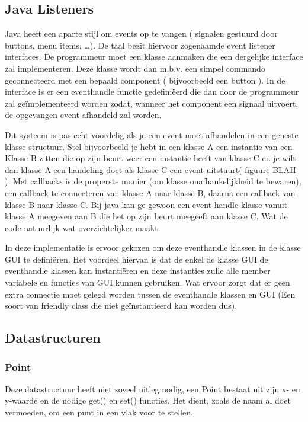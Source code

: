 \documentclass[a4paper,11pt,oneside, titlepage]{article}
\begin{document}
\subsection{Java Listeners}
Java heeft een aparte stijl om events op te vangen ( signalen gestuurd door buttons, menu items,
\ldots ). De taal bezit hiervoor zogenaamde event listener interfaces. De programmeur
moet een klasse aanmaken die een dergelijke interface zal implementeren. Deze klasse wordt dan
m.b.v. een simpel commando geconnecteerd met een bepaald component ( bijvoorbeeld een button ).
In de interface is er een eventhandle functie gedefini\"eerd die dan door de programmeur zal 
ge\"implementeerd worden zodat, wanneer het component een signaal uitvoert,
de opgevangen event afhandeld zal worden.\newline

Dit systeem is pas echt voordelig als je een event moet afhandelen in een geneste klasse 
structuur. Stel bijvoorbeeld je hebt in een klasse A een instantie van een Klasse B zitten
die op zijn beurt weer een instantie heeft van klasse C en je wilt dan klasse A een handeling
doet als klasse C een event uitstuurt( figuure BLAH ). 
Met callbacks is de properste manier (om klasse onafhankelijkheid te bewaren), een callback 
te connecteren van klasse A naar klasse B, daarna een callback van klasse B naar klasse C. 
Bij java kan ge gewoon een event handle klasse vanuit klasse A meegeven aan B die het op zijn 
beurt meegeeft aan klasse C. Wat de code natuurlijk wat overzichtelijker maakt.\newline \newline

In deze implementatie is ervoor gekozen om deze eventhandle klassen in de klasse GUI te 
defini\"eren. Het voordeel hiervan is dat de enkel de klasse GUI de eventhandle klassen kan 
instanti\"eren en deze instanties zulle alle member variabele en functies van GUI kunnen 
gebruiken. Wat ervoor zorgt dat er geen extra connectie moet gelegd worden tussen de 
eventhandle klassen en GUI (Een soort van friendly class die niet ge\"instantieerd kan worden 
dus). 
\subsection{Datastructuren}
\subsubsection{Point}
Deze datastructuur heeft niet zoveel uitleg nodig, een Point bestaat uit zijn x- en y-waarde
en de nodige get() en set() functies. Het dient, zoals de naam al doet vermoeden, om een punt
in een vlak voor te stellen.
\end{document}
